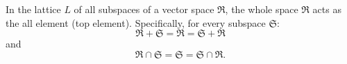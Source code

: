 In the lattice $L$ of all subspaces of a vector space $\mathfrak{R}$, the whole space $\mathfrak{R}$ acts as the all element (top element). Specifically, for every subspace $\mathfrak{S}$:
$$
\mathfrak{R} + \mathfrak{S} = \mathfrak{R} = \mathfrak{S} + \mathfrak{R}
$$
and
$$
\mathfrak{R} \cap \mathfrak{S} = \mathfrak{S} = \mathfrak{S} \cap \mathfrak{R}.
$$
